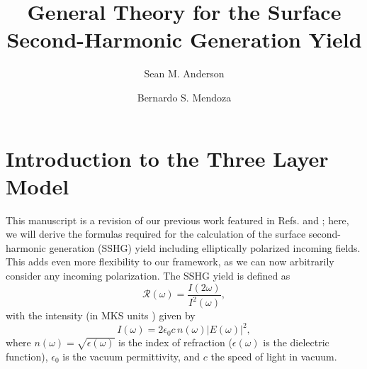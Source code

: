 \documentclass[aps,pra,10pt,amsmath,twocolumn,letterpaper]{revtex4-1}
\begin{document}
\title{General Theory for the Surface Second-Harmonic Generation Yield}
    \author{Sean M. Anderson}

    \author{Bernardo S. Mendoza}

\maketitle



\section{Introduction to the Three Layer Model}\label{sec:3layersshg}

This manuscript is a revision of our previous work featured in Refs.
\cite{andersonPRB16b} and \cite{andersonthesis}; here, we will derive the
formulas required for the calculation of the surface second-harmonic generation
(SSHG) yield including elliptically polarized incoming fields. This adds even
more flexibility to our framework, as we can now arbitrarily consider any
incoming polarization. The SSHG yield is defined as
\begin{equation}\label{eq:rintensities}
\mathcal{R}(\omega)=\frac{I(2\omega)}{I^2(\omega)},
\end{equation}
with the intensity (in MKS units \cite{boyd, sutherland}) given by
\begin{equation}\label{eq:intensity}
I(\omega)=
2\epsilon_{0}c\, n(\omega)|E(\omega)|^{2}
,
\end{equation}
where $n(\omega)=\sqrt{\epsilon(\omega)}$ is the index of refraction
($\epsilon(\omega)$ is the dielectric function), $\epsilon_{0}$ is the vacuum
permittivity, and $c$ the speed of light in vacuum.
\end{document}
